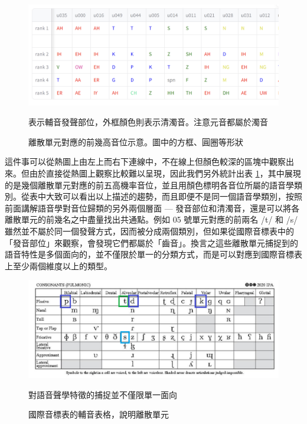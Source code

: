         \begin{figure}
            \centering
            \includegraphics[width=1\linewidth]{figures/unit_rank_phn.png}  %
            \caption[]{
            離散單元對應的前幾高音位示意。圖中的方框、圓圈等形狀}
                  表示輔音發聲部位，外框顏色則表示清濁音。注意元音都屬於濁音
            \label{fig:unit-to-phn-rankings}
        \end{figure}
        
        這件事可以從熱圖上由左上而右下連線中，不在線上但顏色較深的區塊中觀察出來。但由於直接從熱圖上觀察比較難以呈現，因此我們另外統計出表 \ref{fig:unit-to-phn-rankings}，其中展現的是幾個離散單元對應的前五高機率音位，並且用顏色標明各音位所屬的語音學類別。從表中大致可以看出以上描述的趨勢，而且即便不是同一個語音學類別，按照前面講解語音學對音位歸類的另外兩個層面 --- 發音部位和清濁音，還是可以將各離散單元的前幾名之中盡量找出共通點。例如 05 號單元對應的前兩名 /t/ 和 /s/ 雖然並不屬於同一個發聲方式，因而被分成兩個類別，但如果從國際音標表中的「發音部位」來觀察，會發現它們都屬於「齒音」。換言之這些離散單元捕捉到的語音特性是多個面向的，並不僅限於單一的分類方式，而是可以對應到國際音標表上至少兩個維度以上的類型。

\begin{figure}
    \centering
    \includegraphics[width=1\linewidth]{figures/ipa_similarity.png}
    \caption[]{
    國際音標表的輔音表格，說明離散單元}
                                對語音聲學特徵的捕捉並不僅限單一面向
    \label{fig:ipa-cons-table-sim}
\end{figure}

